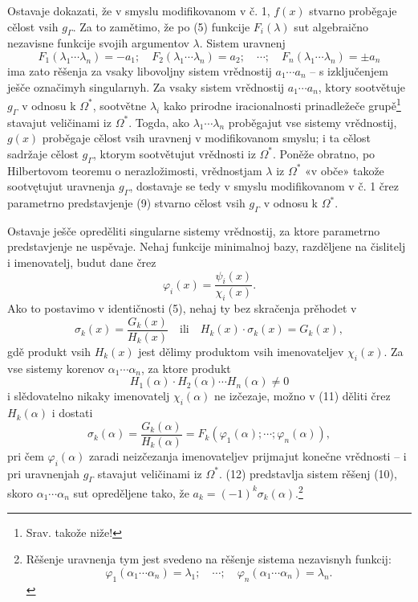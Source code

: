 \documentclass[11pt]{article}
\begin{document}
Ostavaje dokazati, že v smyslu modifikovanom v č. 1, $f(x)$ stvarno proběgaje cělost vsih $g_\Gamma$. Za to zamětimo, že po (5) funkcije $F_i(\lambda)$ sut algebraično nezavisne funkcije svojih argumentov $\lambda$. Sistem uravnenj
\begin{equation}
F_1(\lambda_1\cdots\lambda_n)=-a_1;\quad F_2(\lambda_1\cdots\lambda_n)=a_2;\quad \cdots;\quad F_n(\lambda_1\cdots\lambda_n)=\pm a_n
\tag{10}
\end{equation}
ima zato rěšenja za vsaky libovoljny sistem vrědnostij $a_1\cdots a_n$ -- s izključenjem ješče označimyh singularnyh. Za vsaky sistem vrědnostij $a_1\cdots a_n$, ktory sootvětuje $g_\Gamma$ v odnosu k $\Omega^*$, sootvětne $\lambda_i$ kako prirodne iracionalnosti prinadležeče grupě\footnote{Srav. takože niže!} stavajut veličinami iz $\Omega^*$. Togda, ako $\lambda_1\cdots\lambda_n$ proběgajut vse sistemy vrědnostij, $g(x)$ proběgaje cělost vsih uravnenj v modifikovanom smyslu; i ta cělost sadržaje cělost $g_\Gamma$, ktorym sootvětujut vrědnosti iz $\Omega^*$. Poněže obratno, po Hilbertovom teoremu o nerazložimosti, vrědnostjam $\lambda$ iz $\Omega^*$ «v obče» takože sootvętujut uravnenja $g_\Gamma$, dostavaje se tedy v smyslu modifikovanom v č. 1 črez parametrno predstavjenje (9) stvarno cělost vsih $g_\Gamma$ v odnosu k $\Omega^*$.

Ostavaje ješče opreděliti singularne sistemy vrědnostij, za ktore parametrno predstavjenje ne uspěvaje. Nehaj funkcije minimalnoj bazy, razděljene na čislitelj i imenovatelj, budut dane črez
\[
\varphi_i(x)=\frac{\psi_i(x)}{\chi_i(x)}.
\]
Ako to postavimo v identičnosti (5), nehaj ty bez skračenja prěhodet v
\begin{equation}
\sigma_k(x)=\frac{G_k(x)}{H_k(x)}\quad\text{ili}\quad H_k(x)\cdot\sigma_k(x)=G_k(x),
\tag{11}
\end{equation}
gdě produkt vsih $H_k(x)$ jest dělimy produktom vsih imenovateljev $\chi_i(x)$. Za vse sistemy korenov $\alpha_1\cdots\alpha_n$, za ktore produkt
\[
H_1(\alpha)\cdot H_2(\alpha)\cdots H_n(\alpha)\neq0
\]
i slědovatelno nikaky imenovatelj $\chi_i(\alpha)$ ne izčezaje, možno v (11) děliti črez $H_k(\alpha)$ i dostati
\begin{equation}
\sigma_k(\alpha)=\frac{G_k(\alpha)}{H_k(\alpha)}=F_k(\varphi_1(\alpha);\cdots;\varphi_n(\alpha)),
\tag{12}
\end{equation}
pri čem $\varphi_i(\alpha)$ zaradi neizčezanja imenovateljev prijmajut konečne vrědnosti -- i pri uravnenjah $g_\Gamma$ stavajut veličinami iz $\Omega^*$. (12) predstavlja sistem rěšenj (10), skoro $\alpha_1\cdots\alpha_n$ sut opreděljene tako, že $a_k=(-1)^k\sigma_k(\alpha)$.\footnote{Rěšenje uravnenja tym jest svedeno na rěšenje sistema nezavisnyh funkcij:
\[
\varphi_1(\alpha_1\cdots\alpha_n)=\lambda_1;\quad \cdots;\quad \varphi_n(\alpha_1\cdots\alpha_n)=\lambda_n.
\]}
\end{document}
